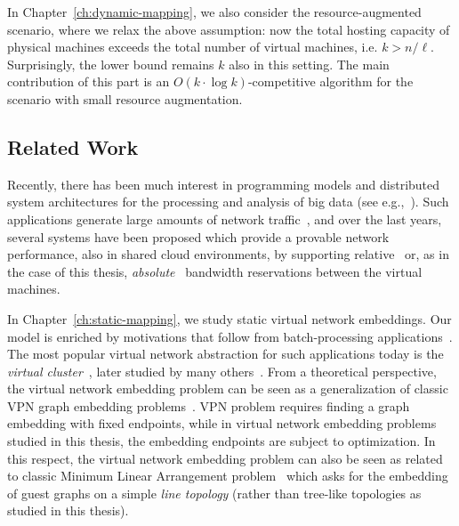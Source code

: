 In Chapter~\ref{ch:dynamic-mapping}, we also consider the resource-augmented scenario, where we relax the above assumption: now the total hosting capacity of physical machines exceeds the total number of virtual machines, i.e. $k > n/\ell$.
Surprisingly, the lower bound remains $k$ also in this setting.
The main contribution of this part is an $O(k\cdot \log k)$-competitive algorithm for the scenario with small resource augmentation.



\subsection{Related Work}


Recently, there has been much interest in programming models and distributed
system architectures for the processing and analysis of big data (see e.g.,~\cite{nodb,mapreduce,shark}).
Such applications
generate large amounts of network traffic~\cite{orchestra,talk-about,amazonbw},
and over the last years, several systems have been proposed which provide
a provable network performance, also in shared cloud environments, by supporting
relative~\cite{faircloud,elasticswitch,seawall}
or, as in the case of this thesis, \emph{absolute}~\cite{oktopus,secondnet,drl,gatekeeper,proteus} bandwidth reservations
between the virtual machines.

\medskip

In Chapter~\ref{ch:static-mapping}, we study static virtual network embeddings.
Our model is enriched by motivations that follow from batch-processing applications~\cite{mapreduce}.
The most popular virtual network abstraction for such applications today is the \emph{virtual cluster}~\cite{oktopus}, later studied by many others~\cite{talk-about,infocom16,ccr15emb,proteus}.
From a theoretical perspective, the virtual network embedding problem can be seen as a generalization
of classic VPN graph embedding problems~\cite{Goyal2008,gupta2001provisioning}. VPN problem requires finding a graph embedding with fixed endpoints, while in virtual network embedding problems studied in this thesis, the embedding endpoints are subject to optimization.
In this respect, the virtual network embedding problem can also be seen as related to
classic Minimum Linear Arrangement problem~\cite{mla-schmoys} which asks for the
embedding of guest graphs on a simple \emph{line topology} (rather than tree-like topologies as
studied in this thesis).

